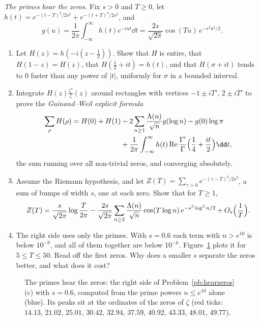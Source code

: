 \begin{exercise}[Journey]\label{pb:hearzeros}
\emph{The primes hear the zeros.} Fix $s>0$ and $T\ge0$, let $h(t)=e^{-(t-T)^2/2s^2}+e^{-(t+T)^2/2s^2}$, and
\[
g(u)=\frac1{2\pi}\int_{-\infty}^\infty h(t)e^{-iut}\dd t=\frac{2s}{\sqrt{2\pi}}\cos(Tu)\,e^{-s^2u^2/2}.
\]
\begin{enumerate}[label=(\alph*)]
\item Let $H(z)=h(-i(z-\frac12))$. Show that $H$ is entire, that $H(1-z)=H(z)$, that $H(\frac12+it)=h(t)$, and that $H(\sigma+it)$ tends to $0$ faster than any
power of $|t|$, uniformly for $\sigma$ in a bounded interval.
\item Integrate $H(z)\frac{\zeta'}\zeta(z)$ around rectangles with vertices $-1\pm iT'$, $2\pm iT'$ to prove the \emph{Guinand--Weil explicit formula}
\[
\begin{aligned}\sum_\rho H(\rho)=H(0)+H(1)&-2\sum_{n\ge1}\frac{\Lambda(n)}{\sqrt n}g(\log n)-g(0)\log\pi\\&+\frac1{2\pi}\int_{-\infty}^\infty h(t)\operatorname{Re}\frac{\Gamma'}\Gamma\Bigl(\frac14+\frac{it}2\Bigr)\dd t,\end{aligned}
\]
the sum running over all non-trivial zeros, and converging absolutely.
\item Assume the Riemann hypothesis, and let $Z(T)=\sum_{\gamma>0}e^{-(\gamma-T)^2/2s^2}$, a sum of bumps of width $s$, one at each zero. Show that for $T\ge1$,
\[
Z(T)=\frac s{\sqrt{2\pi}}\log\frac T{2\pi}-\frac{2s}{\sqrt{2\pi}}\sum_{n\ge2}\frac{\Lambda(n)}{\sqrt n}\cos(T\log n)\,e^{-s^2\log^2n/2}+O_s\Bigl(\frac1T\Bigr).
\]
\item The right side uses only the primes. With $s=0.6$ each term with $n>e^{10}$ is below $10^{-9}$, and all of them together are below $10^{-6}$. Figure~\ref{fig:hearzeros} plots it for $5\le T\le50$. Read off
the first zeros. Why does a smaller $s$ separate the zeros better, and what does it cost?
\end{enumerate}
\end{exercise}

\begin{figure}[ht]
\centering
{}
\caption{The primes hear the zeros: the right side of Problem~\ref{pb:hearzeros}(c) with $s=0.6$, computed from the prime powers $n\le e^{10}$ alone (blue). Its peaks
sit at the ordinates of the zeros of $\zeta$ (red ticks: $14.13$, $21.02$, $25.01$, $30.42$, $32.94$, $37.59$, $40.92$, $43.33$, $48.01$, $49.77$).}\label{fig:hearzeros}
\end{figure}

